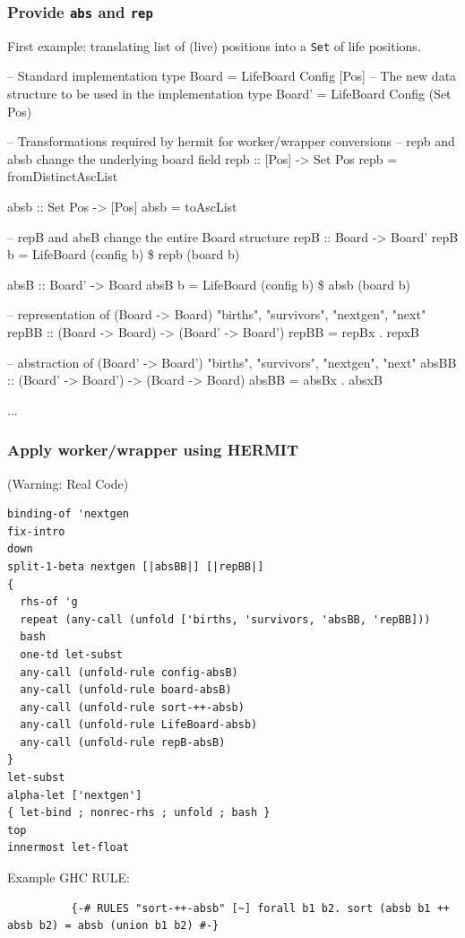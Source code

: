 \documentclass[smaller]{beamer}
\begin{document}
\begin{frame}[fragile]
\frametitle{Provide {\tt abs} and {\tt rep}}

First example: translating list of (live) positions into a \verb|Set| of life positions.

\begin{codeblock}
\tiny
\begin{semiverbatim}
-- Standard implementation
type Board = LifeBoard Config [Pos]
-- The new data structure to be used in the implementation
type Board' = LifeBoard Config (Set Pos)

-- Transformations required by hermit for worker/wrapper conversions
-- repb and absb change the underlying board field
repb :: [Pos] -> Set Pos
repb = fromDistinctAscList

absb :: Set Pos -> [Pos]
absb = toAscList

-- repB and absB change the entire Board structure
repB :: Board -> Board'
repB b = LifeBoard (config b) \$ repb (board b)

absB :: Board' -> Board
absB b = LifeBoard (config b) \$ absb (board b)

-- representation of (Board -> Board) "births", "survivors", "nextgen", "next"
repBB :: (Board -> Board) -> (Board' -> Board')
repBB = repBx . repxB

-- abstraction of (Board' -> Board') "births", "survivors", "nextgen", "next"
absBB :: (Board' -> Board') -> (Board -> Board)
absBB = absBx . absxB

...
\end{semiverbatim}
\end{codeblock}

\end{frame}

\begin{frame}[fragile]
\frametitle{Apply worker/wrapper using HERMIT}

(Warning: Real Code)

\begin{codeblock}
\tiny
\begin{verbatim}
binding-of 'nextgen
fix-intro
down
split-1-beta nextgen [|absBB|] [|repBB|]
{
  rhs-of 'g
  repeat (any-call (unfold ['births, 'survivors, 'absBB, 'repBB]))
  bash
  one-td let-subst
  any-call (unfold-rule config-absB)
  any-call (unfold-rule board-absB)
  any-call (unfold-rule sort-++-absb)
  any-call (unfold-rule LifeBoard-absb)
  any-call (unfold-rule repB-absB)
}
let-subst
alpha-let ['nextgen']
{ let-bind ; nonrec-rhs ; unfold ; bash }
top
innermost let-float
\end{verbatim}
\end{codeblock}

\frameskip

Example GHC RULE:

{\tiny
\begin{verbatim}
          {-# RULES "sort-++-absb" [~] forall b1 b2. sort (absb b1 ++ absb b2) = absb (union b1 b2) #-}
\end{verbatim}
}


\end{frame}
\end{document}
